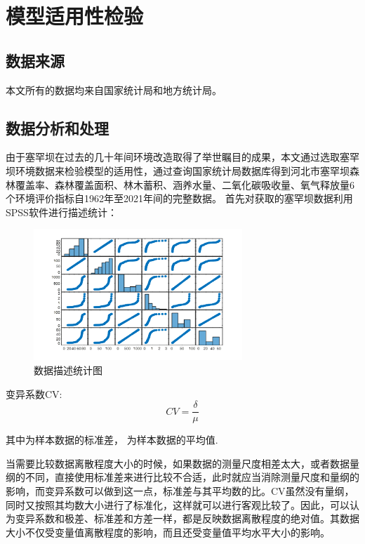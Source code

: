 \documentclass[UTF8]{ctexart}
\begin{document}
\newpage
\section{模型适用性检验}
\subsection{数据来源}
本文所有的数据均来自国家统计局和地方统计局。
\subsection{数据分析和处理}
由于塞罕坝在过去的几十年间环境改造取得了举世瞩目的成果，本文通过选取塞罕坝环境数据来检验模型的适用性，通过查询国家统计局数据库得到河北市塞罕坝森林覆盖率、森林覆盖面积、林木蓄积、涵养水量、二氧化碳吸收量、氧气释放量6个环境评价指标自1962年至2021年间的完整数据。
首先对获取的塞罕坝数据利用SPSS软件进行描述统计：

\begin{figure}[H] %
    \centering %
    \includegraphics[width=0.7\textwidth]{./picture/datascrip.png} %
    \caption{数据描述统计图} 
\end{figure}


变异系数CV:
\begin{equation}
    CV=\frac{\delta}{\mu}
\end{equation}

其中为样本数据的标准差， 为样本数据的平均值.

当需要比较数据离散程度大小的时候，如果数据的测量尺度相差太大，或者数据量纲的不同，直接使用标准差来进行比较不合适，此时就应当消除测量尺度和量纲的影响，而变异系数可以做到这一点，标准差与其平均数的比。CV虽然没有量纲，同时又按照其均数大小进行了标准化，这样就可以进行客观比较了。因此，可以认为变异系数和极差、标准差和方差一样，都是反映数据离散程度的绝对值。其数据大小不仅受变量值离散程度的影响，而且还受变量值平均水平大小的影响。
\end{document}
